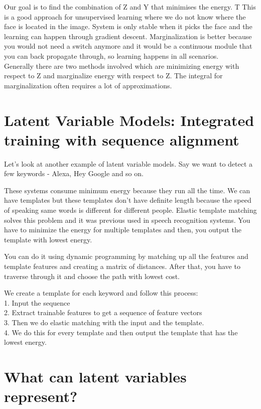 Our goal is to find the combination of Z and Y that minimises the energy. T This is a good approach for unsupervised learning where we do not know where the face is located in the image. System is only stable when it picks the face and the learning can happen through gradient descent. Marginalization is better because you would not need a switch anymore and it would be a continuous module that you can back propagate through, so learning happens in all scenarios.\\ 

Generally there are two methods involved which are minimizing energy with respect to Z and marginalize energy with respect to Z. The integral for marginalization often requires a lot of approximations.

\section{Latent Variable Models: Integrated training with sequence alignment}

Let's look at another example of latent variable models. Say we want to detect a few keywords - Alexa, Hey Google and so on.

These systems consume minimum energy because they run all the time. We can have templates but these templates don't have definite length because the speed of speaking same words is different for different people. Elastic template matching solves this problem and it was previous used in speech recognition systems. You have to minimize the energy for multiple templates and then, you output the template with lowest energy. 

You can do it using dynamic programming by matching up all the features and template features and creating a matrix of distances. After that, you have to traverse through it and choose the path with lowest cost. 

We create a template for each keyword and follow this process:\\
1. Input the sequence\\
2. Extract trainable features to get a sequence of feature vectors\\
3. Then we do elastic matching with the input and the template.\\
4. We do this for every template and then output the template that has the lowest energy.\\

\section{What can latent variables represent?}

